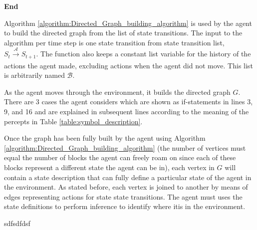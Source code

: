 \begin{algorithm}[H]
{		
	
	}
\Indm 
\textbf{End}   \\
\end{algorithm}
\vspace{0.5cm}

Algorithm \ref{algorithm:Directed_Graph_building_algorithm} is used by the agent to build the directed graph from the list of state transitions. The input to the algorithm per time step is one state transition from state transition list, $S_t \xrightarrow[\text{}]{\mathcal{A}} S_{t+1}$. The function also keeps a constant list variable for the history of the actions the agent made, excluding actions when the agent did not move. This list is arbitrarily named $\mathcal{B}$. 

As the agent moves through the environment, it builds the directed graph $G$. There are 3 cases the agent considers which are shown as if-statements in lines 3, 9, and 16 and are explained in subsequent lines according to the meaning of the percepts in Table \ref{table:symbol_description}. 

Once the graph has been fully built by the agent using Algorithm \ref{algorithm:Directed_Graph_building_algorithm} (the number of vertices must equal the number of blocks the agent can freely roam on since each of these blocks represent a different state the agent can be in), each vertex in $G$ will contain a state description that can fully define a particular state of the agent in the environment. As stated before, each vertex is joined to another by means of edges representing actions for state state transitions. The agent must uses the state definitions to perform inference to identify where itis in the environment.

sdfsdfdsf




















\newpage
